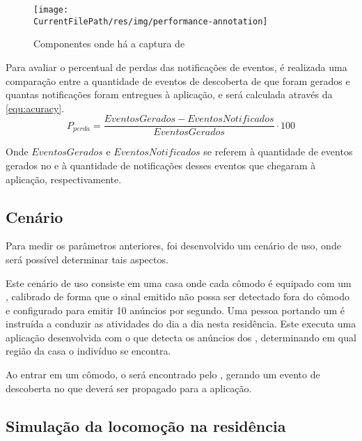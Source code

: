 \begin{figure}[htb]
	
	\begin{center}

		\caption{\label{img:performance-annotation}Componentes onde há a captura de \timestamps}
		\texttt{[image: \\CurrentFilePath/res/img/performance-annotation]}
		\fonte{\autoriapropria}

	\end{center}
	
\end{figure}

Para avaliar o percentual de perdas das notificações de eventos, é realizada uma comparação entre a quantidade de eventos de descoberta de \smartobjs que foram gerados e quantas notificações foram entregues à aplicação, e será calculada através da \autoref{equ:acuracy}.
\begin{equation}
	\label{equ:acuracy}
	P_{perda} = \frac{EventosGerados - EventosNotificados}{EventosGerados} \cdot 100
\end{equation}

Onde $EventosGerados$ e $EventosNotificados$ se referem à quantidade de eventos gerados no \stwopa e à quantidade de notificações desses eventos que chegaram à aplicação, respectivamente.


\subsection{Cenário}\label{sub:cenario}
Para medir os parâmetros anteriores, foi desenvolvido um cenário de uso, onde será possível determinar tais aspectos.

Este cenário de uso consiste em uma casa onde cada cômodo é equipado com um \beacon \ble, calibrado de forma que o sinal emitido não possa ser detectado fora do cômodo e configurado para emitir 10 anúncios por segundo.
Uma pessoa portando um \smartphone é instruída a conduzir as atividades do dia a dia nesta residência.
Este \smartphone executa uma aplicação desenvolvida com o \middleware \mhubcddl que detecta os anúncios dos \beacons, determinando em qual região da casa o indivíduo se encontra.

Ao entrar em um cômodo, o \beacon será encontrado pelo \mhubcddl, gerando um evento de descoberta no \stwopa que deverá ser propagado para a aplicação.

\subsection{Simulação da locomoção na residência}\label{subsec:simulacao-loc}

